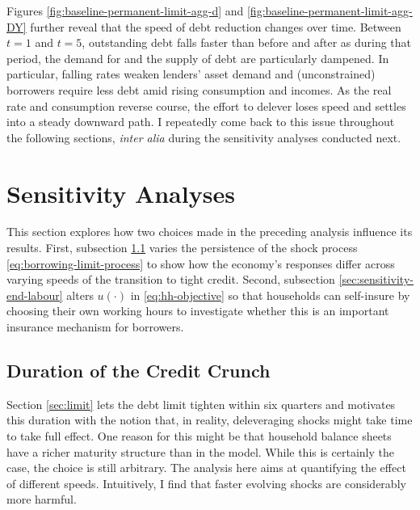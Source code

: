 \documentclass[a4paper,12pt]{article} %
\numberwithin{equation}{section} %
\numberwithin{figure}{section}
\numberwithin{table}{section}
\begin{document}
Figures \ref{fig:baseline-permanent-limit-agg-d} and \ref{fig:baseline-permanent-limit-agg-DY} further reveal that the speed of debt reduction changes over time. Between $t=1$ and $t=5$, outstanding debt falls faster than before and after as during that period, the demand for and the supply of debt are particularly dampened. In particular, falling rates weaken lenders' asset demand and (unconstrained) borrowers require less debt amid rising consumption and incomes. As the real rate and consumption reverse course, the effort to delever loses speed and settles into a steady downward path. I repeatedly come back to this issue throughout the following sections, \textit{inter alia} during the sensitivity analyses conducted next.

\section{Sensitivity Analyses}
\label{sec:sensitivity}

This section explores how two choices made in the preceding analysis influence its results. First, subsection \ref{sec:sensitivity-persistence} varies the persistence of the shock process \eqref{eq:borrowing-limit-process} to show how the economy's responses differ across varying speeds of the transition to tight credit. Second, subsection \ref{sec:sensitivity-end-labour} alters $u( \cdot )$ in \eqref{eq:hh-objective} so that households can self-insure by choosing their own working hours to investigate whether this is an important insurance mechanism for borrowers.

\subsection{Duration of the Credit Crunch}
\label{sec:sensitivity-persistence} 

Section \ref{sec:limit} lets the debt limit tighten within six quarters and motivates this duration with the notion that, in reality, deleveraging shocks might take time to take full effect. One reason for this might be that household balance sheets have a richer maturity structure than in the model. While this is certainly the case, the choice is still arbitrary. The analysis here aims at quantifying the effect of different speeds. Intuitively, I find that faster evolving shocks are considerably more harmful.
\end{document}
